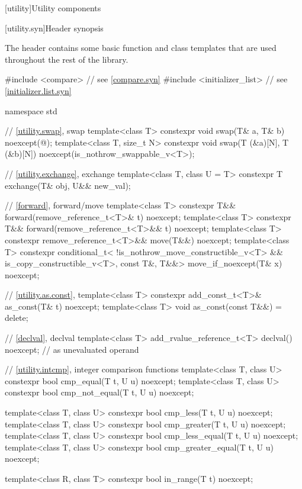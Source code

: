 [utility]{Utility components}

[utility.syn]{Header  synopsis}

\pnum
The header 
contains some basic function and class templates that are used
throughout the rest of the library.

\begin{codeblock}
#include <compare>              // see \ref{compare.syn}
#include <initializer_list>     // see \ref{initializer.list.syn}

namespace std {
  // \ref{utility.swap}, swap
  template<class T>
    constexpr void swap(T& a, T& b) noexcept(@\seebelow@);
  template<class T, size_t N>
    constexpr void swap(T (&a)[N], T (&b)[N]) noexcept(is_nothrow_swappable_v<T>);

  // \ref{utility.exchange}, exchange
  template<class T, class U = T>
    constexpr T exchange(T& obj, U&& new_val);

  // \ref{forward}, forward/move
  template<class T>
    constexpr T&& forward(remove_reference_t<T>& t) noexcept;
  template<class T>
    constexpr T&& forward(remove_reference_t<T>&& t) noexcept;
  template<class T>
    constexpr remove_reference_t<T>&& move(T&&) noexcept;
  template<class T>
    constexpr conditional_t<
        !is_nothrow_move_constructible_v<T> && is_copy_constructible_v<T>, const T&, T&&>
      move_if_noexcept(T& x) noexcept;

  // \ref{utility.as.const}, 
  template<class T>
    constexpr add_const_t<T>& as_const(T& t) noexcept;
  template<class T>
    void as_const(const T&&) = delete;

  // \ref{declval}, declval
  template<class T>
    add_rvalue_reference_t<T> declval() noexcept;   // as unevaluated operand

  // \ref{utility.intcmp}, integer comparison functions
  template<class T, class U>
    constexpr bool cmp_equal(T t, U u) noexcept;
  template<class T, class U>
    constexpr bool cmp_not_equal(T t, U u) noexcept;

  template<class T, class U>
    constexpr bool cmp_less(T t, U u) noexcept;
  template<class T, class U>
    constexpr bool cmp_greater(T t, U u) noexcept;
  template<class T, class U>
    constexpr bool cmp_less_equal(T t, U u) noexcept;
  template<class T, class U>
    constexpr bool cmp_greater_equal(T t, U u) noexcept;

  template<class R, class T>
    constexpr bool in_range(T t) noexcept;

}
\end{codeblock}
